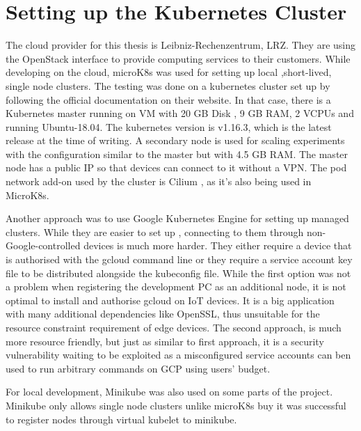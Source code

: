 \section{Setting up the Kubernetes Cluster}
The cloud provider for this thesis is Leibniz-Rechenzentrum, LRZ. They are using the OpenStack \cite{openstack} interface to provide computing services to their customers. While developing on the cloud, microK8s was used for setting up local ,short-lived, single node clusters. The testing was done on a kubernetes cluster set up by following the official documentation on their website. In that case, there is a Kubernetes master running on VM with 20 GB Disk , 9 GB RAM, 2 VCPUs and running Ubuntu-18.04. The kubernetes version is v1.16.3, which is the latest release at the time of writing. A secondary node is used for scaling experiments with the configuration similar to the master but with 4.5 GB RAM. The master node has a public IP so that devices can connect to it without a VPN. The pod network add-on used by the cluster is Cilium \cite{cilium}, as it's also being used in MicroK8s.

Another approach was to use Google Kubernetes Engine for setting up managed clusters. While they are easier to set up , connecting to them through non-Google-controlled devices is much more harder. They either require a device that is authorised with the gcloud command line or they require a service account key file to be distributed alongside the kubeconfig file. While the first option was not a problem when registering the development PC as an additional node, it is not optimal to install and authorise gcloud on IoT devices. It is a big application with many additional dependencies like OpenSSL, thus unsuitable for the resource constraint requirement of edge devices. The second approach, is much more resource friendly, but just as similar to first approach, it is a security vulnerability waiting to be exploited as a misconfigured service accounts can ben used to run arbitrary commands on GCP using users' budget.

For local development, Minikube was also used on some parts of the project. Minikube only allows single node clusters unlike microK8s buy it was successful to register nodes through virtual kubelet to minikube.
